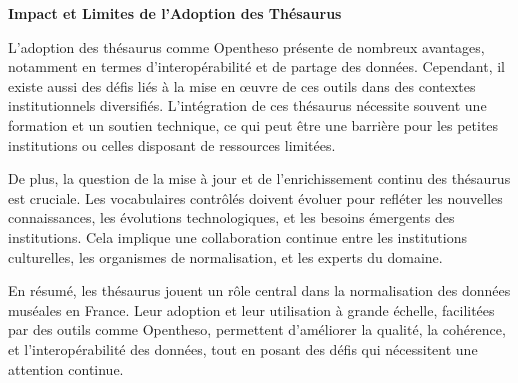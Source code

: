 \textbf{Impact et Limites de l'Adoption des Thésaurus}\newline

L’adoption des thésaurus comme Opentheso présente de nombreux avantages, notamment en termes d'interopérabilité et de partage des données. Cependant, il existe aussi des défis liés à la mise en œuvre de ces outils dans des contextes institutionnels diversifiés. L'intégration de ces thésaurus nécessite souvent une formation et un soutien technique, ce qui peut être une barrière pour les petites institutions ou celles disposant de ressources limitées. \newline

De plus, la question de la mise à jour et de l'enrichissement continu des thésaurus est cruciale. Les vocabulaires contrôlés doivent évoluer pour refléter les nouvelles connaissances, les évolutions technologiques, et les besoins émergents des institutions. Cela implique une collaboration continue entre les institutions culturelles, les organismes de normalisation, et les experts du domaine. \newline

En résumé, les thésaurus jouent un rôle central dans la normalisation des données muséales en France. Leur adoption et leur utilisation à grande échelle, facilitées par des outils comme Opentheso, permettent d'améliorer la qualité, la cohérence, et l'interopérabilité des données, tout en posant des défis qui nécessitent une attention continue.
